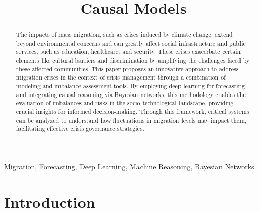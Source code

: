 \documentclass[conference]{IEEEtran}
\begin{document}
	
	\title{Causal Models}
	
	\author{
	}	
	
	
	\maketitle
	
	\begin{abstract}
		The impacts of mass migration, such as crises induced by climate change, extend beyond environmental concerns and can greatly affect social infrastructure and public services, such as education, healthcare, and security. These crises exacerbate certain elements like cultural barriers and discrimination by amplifying the challenges faced by these affected communities. This paper proposes an innovative approach to address migration crises in the context of crisis management through a combination of modeling and imbalance assessment tools. By employing deep learning for forecasting and integrating causal reasoning via Bayesian networks, this methodology enables the evaluation of imbalances and risks in the socio-technological landscape, providing crucial insights for informed decision-making. Through this framework, critical systems can be analyzed to understand how fluctuations in migration levels may impact them, facilitating effective crisis governance strategies.
				
	\end{abstract}
	
	\begin{IEEEkeywords}
		Migration, Forecasting, Deep Learning, Machine Reasoning, Bayesian Networks.
	\end{IEEEkeywords}
	
	\section{Introduction}
	
\end{document}
